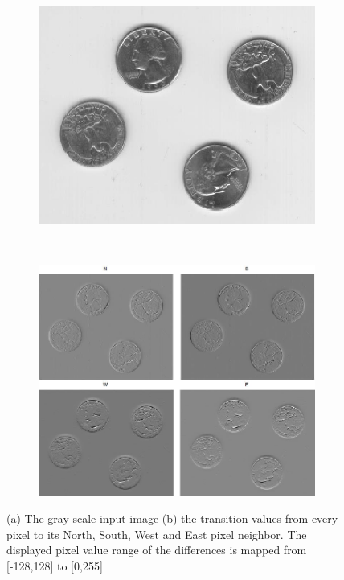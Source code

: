\documentclass[12pt]{article}
\begin{document}
\begin{figure}[tb]
  \centering

  \begin{subfigure}[b]{0.46\textwidth}
        \includegraphics[width=\textwidth]{img/values_init.jpg}
        \caption{}\label{fig:dart_values_init}
    \end{subfigure}~%
    \begin{subfigure}[b]{0.45\textwidth}
        \includegraphics[width=\textwidth]{img/values_new.jpg}
        \caption{}\label{fig:dart_values_news}
    \end{subfigure}

  \caption{(a) The gray scale input image (b) the transition values from every pixel to its North, South, West and East pixel neighbor. The displayed pixel value range of the differences is mapped from [-128,128] to [0,255]}\label{fig:dart_values}
\end{figure}
\end{document}

